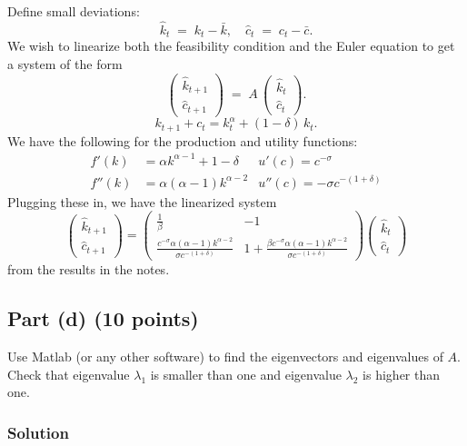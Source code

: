 \documentclass[12pt]{article}
\begin{document}
Define small deviations:
\[
\hat{k}_t 
\;=\;
k_t - \bar{k},
\quad
\hat{c}_t
\;=\;
c_t - \bar{c}.
\]
We wish to linearize both the feasibility condition and the Euler equation to get a system of the form
\[
\begin{pmatrix}
\hat{k}_{t+1} \\[6pt]
\hat{c}_{t+1}
\end{pmatrix}
\;=\;
A\,
\begin{pmatrix}
\hat{k}_t \\[4pt]
\hat{c}_t
\end{pmatrix}.
\]
\[
k_{t+1} + c_t = k_t^\alpha + (1-\delta)\,k_t.
\]
We have the following for the production and utility functions: 
\begin{align*}
    f'(k) &= \alpha k^{\alpha-1} +1-\delta & u'(c) = c^{-\sigma}
    \\ f''(k)&= \alpha(\alpha-1)k^{\alpha-2} & u''(c)=-\sigma c^{-(1+\delta)}
\end{align*}
Plugging these in, we have the linearized system 
\[
\begin{pmatrix}
\hat{k}_{t+1}\\[6pt]
\hat{c}_{t+1}
\end{pmatrix}
=
\begin{pmatrix}
\frac{1}{\beta} & -1 \\ \frac{c^{-\sigma} \alpha(\alpha-1)k^{\alpha-2} }{\sigma c^{-(1+\delta)}} & 1+ \frac{\beta c^{-\sigma} \alpha(\alpha-1)k^{\alpha-2}}{\sigma c^{-(1+\delta)}}
\end{pmatrix}
\begin{pmatrix}
\hat{k}_t\\[4pt]
\hat{c}_t
\end{pmatrix}
\]
from the results in the notes. 


\subsection*{Part (d) (10 points)}
Use Matlab (or any other software) to find the eigenvectors and eigenvalues of \( A \). Check that eigenvalue \( \lambda_1 \) is smaller than one and eigenvalue \( \lambda_2 \) is higher than one.

\subsubsection*{Solution}
\end{document}
